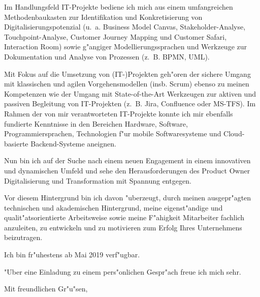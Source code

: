 \documentclass[10pt,a4paper]{dinbrief}
\begin{document}
\begin{letter}
Im Handlungsfeld IT-Projekte bediene ich mich aus einem umfangreichen Methodenbaukasten zur Identifikation und Konkretisierung von Digitalisierungspotenzial (u.~a. Business Model Canvas, Stakeholder-Analyse, Touchpoint-Analyse, Customer Journey Mapping und Customer Safari, Interaction Room) sowie g"angiger Modellierungssprachen und Werkzeuge zur Dokumentation und Analyse von Prozessen (z.~B. BPMN, UML).\clearpage

Mit Fokus auf die Umsetzung von (IT-)Projekten geh"oren der sichere Umgang mit klassischen und agilen Vorgehensmodellen (insb. Scrum) ebenso zu meinen Kompetenzen wie der Umgang mit State-of-the-Art Werkzeugen zur aktiven und passiven Begleitung von IT-Projekten (z.~B. Jira, Confluence oder MS-TFS). Im Rahmen der von mir verantworteten IT-Projekte konnte ich mir ebenfalls fundierte Kenntnisse in den Bereichen Hardware, Software, Programmiersprachen, Technologien f"ur mobile Softwaresysteme und Cloud-basierte Backend-Systeme aneignen.

Nun bin ich auf der Suche nach einem neuen Engagement in einem innovativen und dynamischen Umfeld und sehe den Herausforderungen des Product Owner Digitalisierung und Transformation mit Spannung entgegen.

Vor diesem Hintergrund bin ich davon "uberzeugt, durch meinen ausgepr"agten technischen und akademischen Hintergrund, meine eigenst"andige und qualit"atsorientierte Arbeitsweise sowie meine F"ahigkeit Mitarbeiter fachlich anzuleiten, zu entwickeln und zu motivieren zum Erfolg Ihres Unternehmens beizutragen.

Ich bin fr"uhestens ab Mai 2019 verf"ugbar. %

"Uber eine Einladung zu einem pers"onlichen Gespr"ach freue ich mich sehr.

\closing{Mit freundlichen Gr"u"sen,}
\end{letter}
\end{document}
